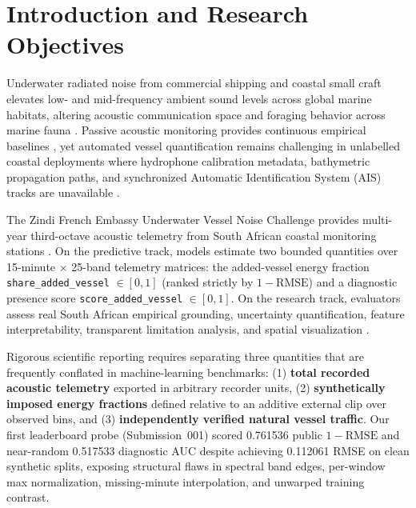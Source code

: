\documentclass[10pt,a4paper]{article}
\begin{document}
\section{Introduction and Research Objectives}

Underwater radiated noise from commercial shipping and coastal small craft elevates low- and mid-frequency ambient sound levels across global marine habitats, altering acoustic communication space and foraging behavior across marine fauna \parencite{duarte2021soundscape,wenz1962ambient}. Passive acoustic monitoring provides continuous empirical baselines \parencite{merchant2015measuring}, yet automated vessel quantification remains challenging in unlabelled coastal deployments where hydrophone calibration metadata, bathymetric propagation paths, and synchronized Automatic Identification System (AIS) tracks are unavailable \parencite{iso2017underwater}.

The Zindi French Embassy Underwater Vessel Noise Challenge provides multi-year third-octave acoustic telemetry from South African coastal monitoring stations \parencite{zindi2026challenge,zindi2026rules}. On the predictive track, models estimate two bounded quantities over 15-minute $\times$ 25-band telemetry matrices: the added-vessel energy fraction \texttt{share\_added\_vessel} $\in [0,1]$ (ranked strictly by $1 - \mathrm{RMSE}$) and a diagnostic presence score \texttt{score\_added\_vessel} $\in [0,1]$. On the research track, evaluators assess real South African empirical grounding, uncertainty quantification, feature interpretability, transparent limitation analysis, and spatial visualization \parencite{zindi2026rules}.

Rigorous scientific reporting requires separating three quantities that are frequently conflated in machine-learning benchmarks: (1) \textbf{total recorded acoustic telemetry} exported in arbitrary recorder units, (2) \textbf{synthetically imposed energy fractions} defined relative to an additive external clip over observed bins, and (3) \textbf{independently verified natural vessel traffic}. Our first leaderboard probe (Submission~001) scored 0.761536 public $1 - \mathrm{RMSE}$ and near-random 0.517533 diagnostic AUC despite achieving 0.112061 RMSE on clean synthetic splits, exposing structural flaws in spectral band edges, per-window max normalization, missing-minute interpolation, and unwarped training contrast.
\end{document}
